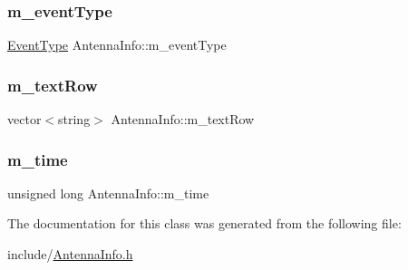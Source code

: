 \subsubsection{\texorpdfstring{m\+\_\+event\+Type}{m\_eventType}}
{\footnotesize\ttfamily \hyperlink{_event_type_8h_a2628ea8d12e8b2563c32f05dc7fff6fa}{Event\+Type} Antenna\+Info\+::m\+\_\+event\+Type\hspace{0.3cm}{\ttfamily [private]}}

\mbox{\label{class_antenna_info_a46f54626284418436f65f03718e8d38e}} 
\subsubsection{\texorpdfstring{m\+\_\+text\+Row}{m\_textRow}}
{\footnotesize\ttfamily vector$<$string$>$ Antenna\+Info\+::m\+\_\+text\+Row\hspace{0.3cm}{\ttfamily [private]}}

\mbox{\label{class_antenna_info_a355d929c83040e154f635ce149286b05}} 
\subsubsection{\texorpdfstring{m\+\_\+time}{m\_time}}
{\footnotesize\ttfamily unsigned long Antenna\+Info\+::m\+\_\+time\hspace{0.3cm}{\ttfamily [private]}}



The documentation for this class was generated from the following file\+:\begin{DoxyCompactItemize}
\item 
include/\hyperlink{_antenna_info_8h}{Antenna\+Info.\+h}\end{DoxyCompactItemize}
